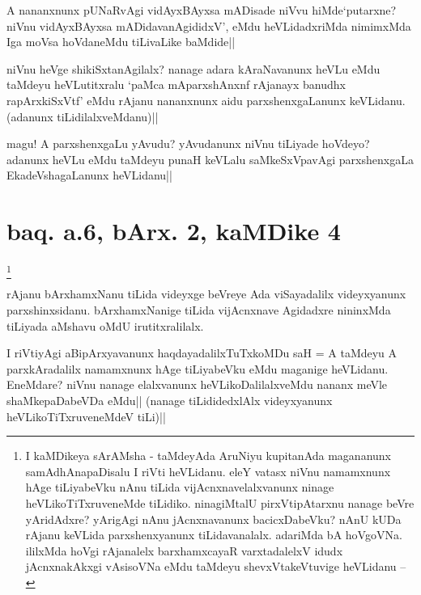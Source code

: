
\begin{artha}
A nananxnunx pUNaRvAgi vidAyxBAyxsa mADisade niVvu hiMde`putarxne? 
niVnu vidAyxBAyxsa mADidavanAgididxV', eMdu heVLidadxriMda nimimxMda 
Iga moVsa hoVdaneMdu tiLivaLike baMdide||
\end{artha}

\begin{artha}
niVnu heVge shikiSxtanAgilalx? nanage adara kAraNavanunx heVLu eMdu 
taMdeyu heVLutitxralu `paMca mAparxshAnxnf rAjanayx banudhx 
rapArxkiSxVtf' eMdu rAjanu nananxnunx aidu parxshenxgaLanunx 
keVLidanu. (adanunx tiLidilalxveMdanu)||
\end{artha}

\begin{artha}
magu! A parxshenxgaLu yAvudu? yAvudanunx niVnu tiLiyade hoVdeyo? 
adanunx heVLu eMdu taMdeyu punaH keVLalu saMkeSxVpavAgi parxshenxgaLa 
EkadeVshagaLanunx heVLidanu||
\end{artha}

\section*{baq. a.6, bArx. 2, kaMDike 4}

\footnote[1]{I kaMDikeya sArAMsha - taMdeyAda AruNiyu kupitanAda 
magananunx samAdhAnapaDisalu I riVti heVLidanu. eleY vatasx niVnu 
namamxnunx hAge tiLiyabeVku nAnu tiLida vijAcnxnavelalxvanunx ninage 
heVLikoTiTxruveneMde tiLidiko. ninagiMtalU pirxVtipAtarxnu nanage 
beVre yAridAdxre? yArigAgi nAnu jAcnxnavanunx bacicxDabeVku? nAnU kUDa 
rAjanu keVLida parxshenxyanunx tiLidavanalalx. adariMda bA hoVgoVNa. 
ililxMda hoVgi rAjanalelx barxhamxcayaR varxtadalelxV idudx 
jAcnxnakAkxgi vAsisoVNa eMdu taMdeyu shevxVtakeVtuvige heVLidanu --}\stext

\begin{artha}
rAjanu bArxhamxNanu tiLida videyxge beVreye Ada viSayadalilx 
videyxyanunx parxshinxsidanu. bArxhamxNanige tiLida vijAcnxnave 
Agidadxre nininxMda tiLiyada aMshavu oMdU irutitxralilalx. 
\end{artha}

\begin{artha}
I riVtiyAgi aBipArxyavanunx haqdayadalilxTuTxkoMDu saH = A taMdeyu A 
parxkAradalilx namamxnunx hAge tiLiyabeVku eMdu maganige heVLidanu. 
EneMdare? niVnu nanage elalxvanunx heVLikoDalilalxveMdu nananx meVle 
shaMkepaDabeVDa eMdu|| (nanage tiLididedxlAlx videyxyanunx 
heVLikoTiTxruveneMdeV tiLi)||
\end{artha}

